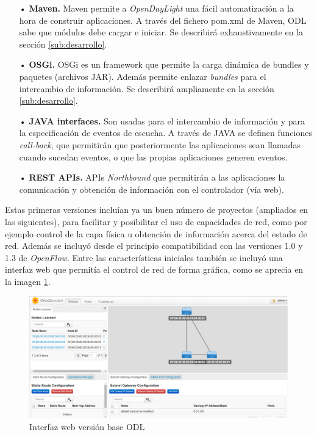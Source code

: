 \documentclass[a4paper,11pt]{book}
\begin{document}
\begin{itemize}
\item[•] \textbf{Maven.} Maven permite a \emph{OpenDayLight} una fácil automatización a la hora de construir aplicaciones. A través del fichero pom.xml de Maven, \ac{ODL} sabe que módulos debe cargar e iniciar. Se describirá exhaustivamente en la sección \ref{sub:desarrollo}.

\item[•] \textbf{OSGi.} OSGi es un framework que permite la carga dinámica de bundles y paquetes (archivos JAR). Además permite enlazar \textit{bundles} para el intercambio de información. Se describirá ampliamente en la sección \ref{sub:desarrollo}.

\item[•] \textbf{JAVA interfaces.} Son usadas para el intercambio de información y para la especificación de eventos de escucha. A través de JAVA se definen funciones \textit{call-back}, que permitirán que posteriormente las aplicaciones sean llamadas cuando sucedan eventos, o que las propias aplicaciones generen eventos.

\item[•] \textbf{\ac{REST} \ac{API}s.} \ac{API}s \textit{Northbound} que permitirán a las aplicaciones la comunicación y obtención de información con el controlador (vía web). 
\end{itemize}

Estas primeras versiones incluían ya un buen número de proyectos (ampliados en las siguientes), para facilitar y posibilitar el uso de capacidades de red, como por ejemplo control de la capa física u obtención de información acerca del estado de red. Además se incluyó desde el principio compatibilidad con las versiones 1.0 y 1.3 de \emph{OpenFlow}. Entre las características iniciales también se incluyó una interfaz web que permitía el control de red de forma gráfica, como se aprecia en la imagen \ref{dlux}.

\begin{figure}[tb]
\centering
\includegraphics[scale=0.333]{./figuras/dlux1}
\caption{Interfaz web versión base \ac{ODL}}\label{dlux}
\end{figure}
\end{document}
